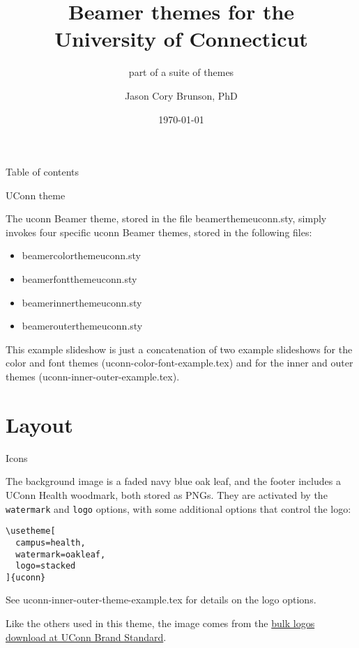 \documentclass{beamer}
\title[Beamer themes for UConn]{Beamer themes for the\\ University of Connecticut}
\subtitle{part of a suite of themes}
\author[Cory Brunson]{Jason Cory Brunson, PhD}
\institute[UConn Health]{Center for Quantitative Medicine\\ University of Connecticut School of Medicine}
\date{\today}
\begin{document}
\begin{frame}
\titlepage
\end{frame}


\begin{frame}{Table of contents}
\tableofcontents
\end{frame}


\begin{frame}{UConn theme}

The {\ttfamily uconn} Beamer theme, stored in the file {\ttfamily beamerthemeuconn.sty}, simply invokes four specific {\ttfamily uconn} Beamer themes, stored in the following files:
\begin{itemize}
\ttfamily
\item beamercolorthemeuconn.sty
\item beamerfontthemeuconn.sty
\item beamerinnerthemeuconn.sty
\item beamerouterthemeuconn.sty
\end{itemize}

This example slideshow is just a concatenation of two example slideshows for the color and font themes ({\ttfamily uconn-color-font-example.tex}) and for the inner and outer themes ({\ttfamily uconn-inner-outer-example.tex}).

\end{frame}


\section{Layout}


\begin{frame}[fragile]{Icons}

The background image is a faded navy blue oak leaf, and the footer includes a UConn Health woodmark, both stored as PNGs.
They are activated by the \verb|watermark| and \verb|logo| options, with some additional options that control the logo:

\begin{verbatim}
\usetheme[
  campus=health,
  watermark=oakleaf,
  logo=stacked
]{uconn}
\end{verbatim}

See {\ttfamily uconn-inner-outer-theme-example.tex} for details on the logo options.

Like the others used in this theme, the image comes from the \href{https://brand.uconn.edu/downloads/logos/}{bulk logos download at UConn Brand Standard}.

\end{frame}
\end{document}
